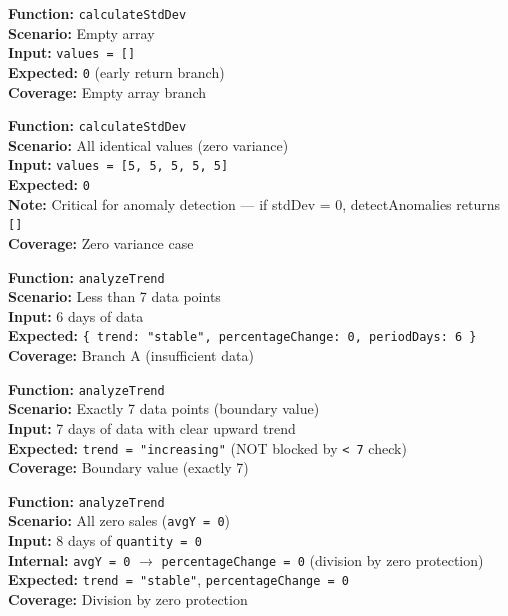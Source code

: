 \documentclass[12pt,onecolumn]{IEEEtran}
\begin{document}
\textbf{Function:} \texttt{calculateStdDev} \\
\textbf{Scenario:} Empty array \\
\textbf{Input:} \texttt{values = []} \\
\textbf{Expected:} \texttt{0} (early return branch) \\
\textbf{Coverage:} Empty array branch



\textbf{Function:} \texttt{calculateStdDev} \\
\textbf{Scenario:} All identical values (zero variance) \\
\textbf{Input:} \texttt{values = [5, 5, 5, 5, 5]} \\
\textbf{Expected:} \texttt{0} \\
\textbf{Note:} Critical for anomaly detection --- if stdDev = 0, detectAnomalies returns \texttt{[]} \\
\textbf{Coverage:} Zero variance case



\textbf{Function:} \texttt{analyzeTrend} \\
\textbf{Scenario:} Less than 7 data points \\
\textbf{Input:} 6 days of data \\
\textbf{Expected:} \texttt{\{ trend: "stable", percentageChange: 0, periodDays: 6 \}} \\
\textbf{Coverage:} Branch A (insufficient data)



\textbf{Function:} \texttt{analyzeTrend} \\
\textbf{Scenario:} Exactly 7 data points (boundary value) \\
\textbf{Input:} 7 days of data with clear upward trend \\
\textbf{Expected:} \texttt{trend = "increasing"} (NOT blocked by \texttt{< 7} check) \\
\textbf{Coverage:} Boundary value (exactly 7)



\textbf{Function:} \texttt{analyzeTrend} \\
\textbf{Scenario:} All zero sales (\texttt{avgY = 0}) \\
\textbf{Input:} 8 days of \texttt{quantity = 0} \\
\textbf{Internal:} \texttt{avgY = 0} $\to$ \texttt{percentageChange = 0} (division by zero protection) \\
\textbf{Expected:} \texttt{trend = "stable"}, \texttt{percentageChange = 0} \\
\textbf{Coverage:} Division by zero protection
\end{document}
